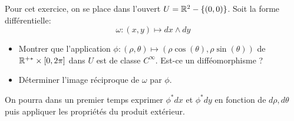 \begin{exercice}
Pour cet exercice, on se place dans l'ouvert $U = \mathbb{R}^2-\{(0,0)\}$. Soit la forme différentielle:
\[
\omega \colon (x,y) \mapsto dx \wedge dy
\]
\begin{itemize}
\item Montrer que l'application $\phi \colon (\rho,\theta) \mapsto (\rho \cos(\theta), \rho \sin(\theta))$ de $\mathbb{R}^{+*}\times [0,2\pi]$ dans $U$ est de classe $C^\infty$. Est-ce un difféomorphisme ?
\item Déterminer l'image réciproque de $\omega$ par $\phi$. 
\end{itemize}
On pourra dans un premier temps exprimer $\phi^*dx$ et $\phi^*dy$ en fonction de $d\rho, d\theta$ puis appliquer les propriétés du produit extérieur.
\end{exercice}

